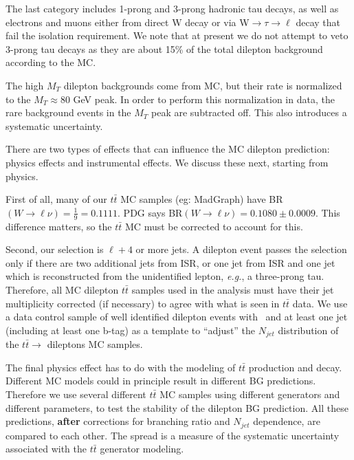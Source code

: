 The last category includes 1-prong and 3-prong hadronic tau decays, as well as electrons and muons either from direct W decay or via W$\to\tau\to\ell$ decay 
that fail the isolation requirement.
We note that at present we do not attempt to veto 3-prong tau decays as they are about 15\% of the total dilepton background according to the MC.

The high $M_T$ dilepton backgrounds come from MC, but their rate is normalized to the 
$M_T \approx 80$ GeV peak.  In order to perform this normalization in
data, the rare background events in the $M_T$ peak are subtracted off.  This also introduces a systematic uncertainty.

There are two types of effects that can influence the MC dilepton prediction: physics effects 
and instrumental effects.  We discuss these next, starting from physics.

First of all, many of our $t\bar{t}$ MC samples (eg: MadGraph) have
 BR$(W \to \ell \nu)=\frac{1}{9} = 0.1111$.
PDG says BR$(W \to \ell \nu) = 0.1080 \pm 0.0009$.  This difference matters, so the $t\bar{t}$ MC 
must be corrected to account for this.

Second, our selection is $\ell +4$ or more jets.  A dilepton event passes the selection only if there are 
two additional jets from ISR, or one jet from ISR and one jet which is reconstructed from the 
unidentified lepton, {\it e.g.}, a three-prong tau.  Therefore, all MC dilepton $t\bar{t}$ samples used
in the analysis must have their jet multiplicity corrected (if necessary) to agree with what is 
seen in $t\bar{t}$ data.  We use a data control sample of well identified dilepton events with
\met\ and at least one jet (including at least one b-tag) as a template to ``adjust'' the $N_{jet}$ distribution of the $t\bar{t} \to$
dileptons MC samples.

The final physics effect has to do with the modeling of $t\bar{t}$ production and decay.  Different
MC models could in principle result in different BG predictions.  Therefore we use several different 
$t\bar{t}$ MC samples using different generators and different parameters, to test the stability
of the dilepton BG prediction.  All these predictions, {\bf after} corrections for branching ratio
and $N_{jet}$ dependence, are compared to each other.  The spread is a measure of the systematic
uncertainty associated with the $t\bar{t}$ generator modeling.

